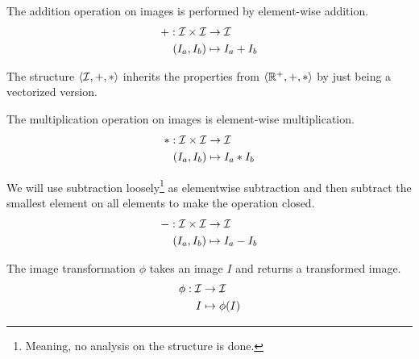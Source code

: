 \begin{definition}
 \label{def:image_addition}
  The addition operation on images is performed by element-wise
  addition.
  \begin{equation}
    \begin{split}
      + : \mathcal{I} \times \mathcal{I} &\rightarrow \mathcal{I}\\
      (I_a,I_b) &\mapsto I_a+I_b
    \end{split}
  \end{equation}

  The structure $\langle \mathcal{I},+,*\rangle$ inherits the properties from
  $\langle \mathbb{R}^+,+,*\rangle$ by just being a vectorized version.
\end{definition}

\begin{definition}
 \label{def:image_multiplication}
  The multiplication operation on images is element-wise
  multiplication.
  \begin{equation}
    \begin{split}
      * : \mathcal{I} \times \mathcal{I} &\rightarrow \mathcal{I}\\
      (I_a,I_b) &\mapsto I_a*I_b
    \end{split}
  \end{equation}
\end{definition}

\begin{definition}
\label{def:image_subtraction}
  We will use subtraction loosely\footnote{Meaning, no analysis on the
    structure is done.} as elementwise subtraction and then subtract
  the smallest element on all elements to make the operation closed.
  \begin{equation}
    \begin{split}
      - : \mathcal{I} \times \mathcal{I} &\rightarrow \mathcal{I}\\
      (I_a,I_b) &\mapsto I_a-I_b
    \end{split}
  \end{equation}
\end{definition}

\begin{definition}
\label{def:image_transform}
  The image transformation $\phi$ takes an image $I$ and returns a
  transformed image.
  \begin{equation}
    \begin{split}
      \phi : \mathcal{I} &\rightarrow \mathcal{I}\\
      I &\mapsto \phi(I)
    \end{split}
  \end{equation}
\end{definition}

